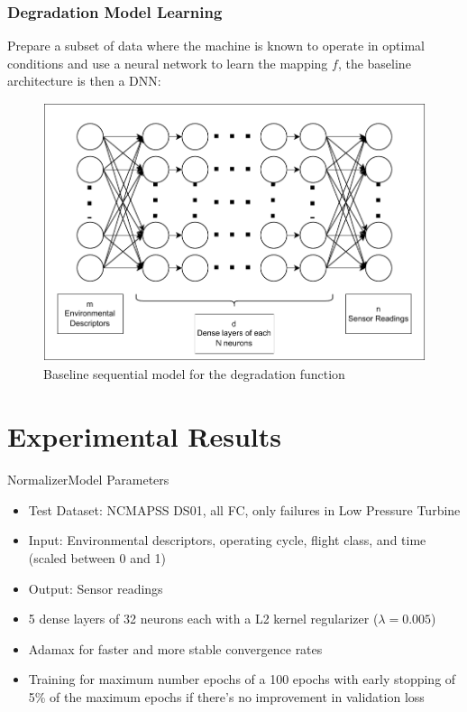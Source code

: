 \documentclass{beamer}
\begin{document}
            \begin{frame}
                \frametitle{Degradation Model Learning}
                Prepare a subset of data where the machine is known to operate in optimal conditions and use a neural network to learn the mapping $f$, the baseline architecture is then a DNN:
                \begin{figure}[!htbp]
                    \centering
                    \includegraphics[scale=0.45]{descriptor_predictor_diagram.pdf}
                    \caption{Baseline sequential model for the degradation function}
                \end{figure}
            \end{frame}

    \section{Experimental Results}

        \begin{frame}{Normalizer}{Model Parameters}
            \begin{itemize}
                \item Test Dataset: NCMAPSS DS01, all FC, only failures in Low Pressure Turbine
                \item Input: Environmental descriptors, operating cycle, flight class, and time (scaled between 0 and 1)
                \item Output: Sensor readings
                \item 5 dense layers of 32 neurons each with a L2 kernel regularizer ($\lambda = 0.005$)
                \item Adamax for faster and more stable convergence rates
                \item Training for maximum number epochs of a 100 epochs with early stopping of 5\% of the maximum epochs if there's no improvement in validation loss
            \end{itemize}
        \end{frame}
\end{document}
